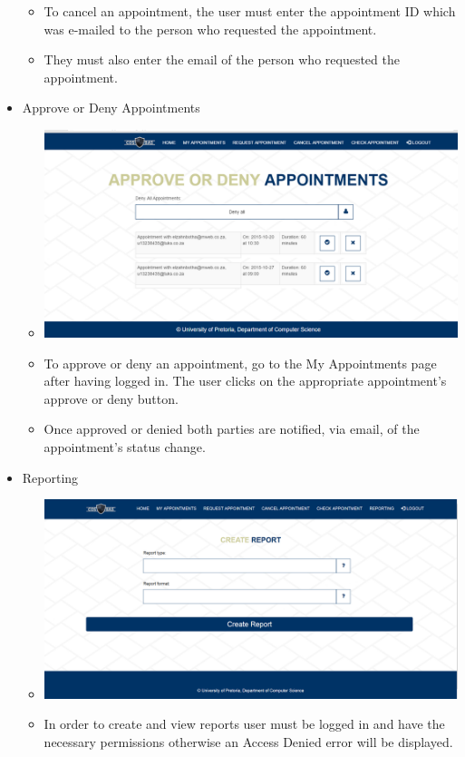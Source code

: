 \begin{itemize}
\begin{itemize}
				\item To cancel an appointment, the user must enter the appointment ID which was e-mailed to the person who requested the appointment.
				\item They must also enter the email of the person who requested the appointment.
			\end{itemize}
		\item Approve or Deny Appointments
			\begin{itemize}
				\item \includegraphics[width=\linewidth]{images/Screenshots/Approve_Deny.png}
				\item To approve or deny an appointment, go to the My Appointments page after having logged in. The user clicks on the appropriate appointment's approve or deny button.
				\item Once approved or denied both parties are notified, via email, of the appointment's status change.
			\end{itemize}
		\item Reporting
			\begin{itemize}
				\item \includegraphics[width=\linewidth]{images/Screenshots/reporting.png}
				\item In order to create and view reports user must be logged in and have the necessary permissions otherwise an Access Denied error will be displayed.

\end{itemize}
\end{itemize}
